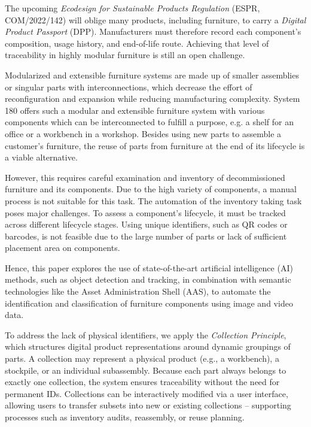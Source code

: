 \documentclass[3p,times,procedia]{elsarticle}
\begin{document}
The upcoming \emph{Ecodesign for Sustainable Products Regulation} (ESPR, COM/2022/142) \cite{ESPRRegulation2022} will oblige many products, including furniture, to carry a \emph{Digital Product Passport} (DPP).  Manufacturers must therefore record each component’s composition, usage history, and end-of-life route.  Achieving that level of traceability in highly modular furniture is still an open challenge.

Modularized and extensible furniture systems are made up of smaller assemblies or singular parts with interconnections, which decrease the effort of reconfiguration and expansion while reducing manufacturing complexity. System 180 offers such a modular and extensible furniture system with various components which can be interconnected to fulfill a purpose, e.g. a shelf for an office or a workbench in a workshop. Besides using new parts to assemble a customer's furniture, the reuse of parts from furniture at the end of its lifecycle is a viable alternative. 

However, this requires careful examination and inventory of decommissioned furniture and its components. Due to the high variety of components, a manual process is not suitable for this task. The automation of the inventory taking task poses major challenges. To assess a component's lifecycle, it must be tracked across different lifecycle stages. Using unique identifiers, such as QR codes or barcodes, is not feasible due to the large number of parts or lack of sufficient placement area on components.

Hence, this paper explores the use of state-of-the-art artificial intelligence (AI) methods, such as object detection and tracking, in combination with semantic technologies like the Asset Administration Shell (AAS), to automate the identification and classification of furniture components using image and video data.

To address the lack of physical identifiers, we apply the \textit{Collection Principle}, which structures digital product representations around dynamic groupings of parts. A collection may represent a physical product (e.g., a workbench), a stockpile, or an individual subassembly. Because each part always belongs to exactly one collection, the system ensures traceability without the need for permanent IDs. Collections can be interactively modified via a user interface, allowing users to transfer subsets into new or existing collections -- supporting processes such as inventory audits, reassembly, or reuse planning.
\end{document}
